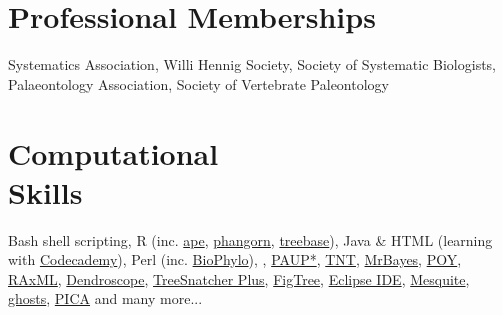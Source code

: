 \documentclass[margin,line]{resume}
\begin{document}
\begin{resume}
\vspace{-7 mm} 
    \section{\mysidestyle Professional Memberships}

Systematics Association, Willi Hennig Society, Society of Systematic Biologists, \\
Palaeontology Association, Society of Vertebrate Paleontology\\

\vspace{-7 mm}  
    \section{\mysidestyle Computational \\ Skills} 

    Bash shell scripting, R (inc. \href{http://cran.r-project.org/web/packages/ape/}{ape}, \href{http://cran.r-project.org/web/packages/phangorn/}{phangorn}, \href{http://cran.r-project.org/web/packages/treebase/}{treebase}), Java \& HTML (learning with \href{http://www.codecademy.com/users/rmounce}{Codecademy}), Perl (inc. \href{http://search.cpan.org/dist/Bio-Phylo/}{BioPhylo}), \LaTeXe, \href{http://paup.csit.fsu.edu/}{PAUP*}, \href{http://www.zmuc.dk/public/phylogeny/tnt/}{TNT}, \href{http://mrbayes.sourceforge.net/}{MrBayes}, \href{http://research.amnh.org/scicomp/research/projects/invertebrate-zoology/poy?q=projects/poy.php}{POY}, \href{http://sco.h-its.org/exelixis/software.html}{RAxML}, \href{http://ab.inf.uni-tuebingen.de/software/dendroscope/}{Dendroscope}, \href{http://www.cs.uni-duesseldorf.de/AG/BI/Software/treesnatcher/}{TreeSnatcher Plus}, \href{http://tree.bio.ed.ac.uk/software/figtree/}{FigTree}, \href{http://www.eclipse.org/}{Eclipse IDE}, \href{http://mesquiteproject.org/mesquite/mesquite.html}{Mesquite}, \href{http://palaeo.gly.bris.ac.uk/cladestrat/Gho2.html}{ghosts}, \href{http://www.nhm.ac.uk/research-curation/research/projects/software/}{PICA} and many more...\\

\vspace{-7 mm} 

\end{resume}
\end{document}
